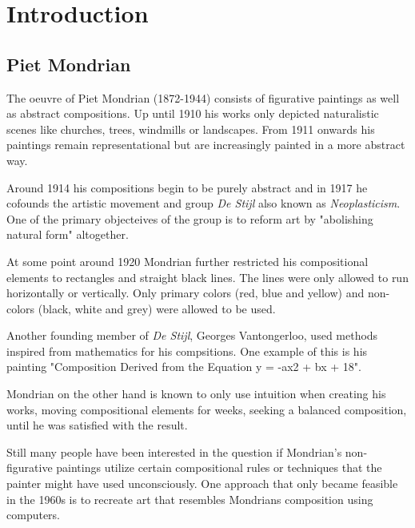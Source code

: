 \section{Introduction}


\subsection{Piet Mondrian}

The oeuvre of Piet Mondrian (1872-1944) consists of figurative paintings as well
as abstract compositions. Up until 1910 his works only depicted naturalistic
scenes like churches, trees, windmills or landscapes. From 1911 onwards his
paintings remain representational but are increasingly painted in a more
abstract way.

Around 1914 his compositions begin to be purely abstract and in 1917 he cofounds
the artistic movement and group \textit{De Stijl} also known as
\textit{Neoplasticism}. One of the primary objecteives of the group is to reform
art by "abolishing natural form" \cite{wiki:manifest} altogether.

At some point around 1920 Mondrian further restricted his compositional elements
to rectangles and straight black lines. The lines were only allowed to run
horizontally or vertically. Only primary colors (red, blue and yellow) and
non-colors (black, white and grey) were allowed to be used.

Another founding member of \textit{De Stijl}, Georges Vantongerloo, used methods
inspired from mathematics for his compsitions. One example of this is his
painting "Composition Derived from the Equation y = -ax2 + bx + 18".

Mondrian on the other hand is known to only use intuition when creating his
works, moving compositional elements for weeks, seeking a balanced composition,
until he was satisfied with the result.

Still many people have been interested in the question if Mondrian's
non-figurative paintings utilize certain compositional rules or techniques that
the painter might have used unconsciously. One approach that only became
feasible in the 1960s is to recreate art that resembles Mondrians composition
using computers.

